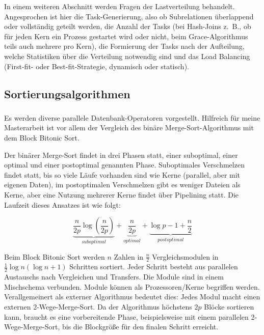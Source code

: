 \documentclass[a4paper,12pt,twoside]{article}
\begin{document}
In einem weiteren Abschnitt werden Fragen der Lastverteilung behandelt. Angesprochen ist hier die Task-Generierung, also ob Subrelationen überlappend oder vollständig geteilt werden, die Anzahl der Tasks (bei Hash-Joins z.~B., ob für jeden Kern ein Prozess gestartet wird oder nicht, beim Grace-Algorithmus teils auch mehrere pro Kern), die Formierung der Tasks nach der Aufteilung, welche Statistiken über die Verteilung notwendig sind und das Load Balancing (First-fit- oder Best-fit-Strategie, dynamisch oder statisch). 

\subsection{Sortierungsalgorithmen}

\subsubsection*{}

Es werden diverse parallele Datenbank-Operatoren vorgestellt. Hilfreich für meine Masterarbeit ist vor allem der Vergleich des binäre Merge-Sort-Algorithmus mit dem Block Bitonic Sort.

Der binärer Merge-Sort findet in drei Phasen statt, einer suboptimal, einer optimal und einer postoptimal genannten Phase. Suboptimales Verschmelzen findet statt, bis so viele Läufe vorhanden sind wie Kerne (parallel, aber mit eigenen Daten), im postoptimalen Verschmelzen gibt es weniger Dateien als Kerne, aber eine Nutzung mehrerer Kerne findet über Pipelining statt. Die Laufzeit dieses Ansatzes ist wie folgt:

\[ \underbrace{\frac{n}{2p} \log \left( \frac{n}{2p} \right)}_{suboptimal} + \underbrace{\frac{n}{2p}}_{optimal} + \underbrace{\log p - 1 + \frac{n}{2}}_{postoptimal} \]

Beim Block Bitonic Sort werden $n$ Zahlen in $\frac{n}{2}$ Vergleichsmodulen in $\frac{1}{2} \log n (\log n +1)$ Schritten sortiert. Jeder Schritt besteht aus parallelen Austauschs nach Vergleichen und Transfers. Die  Module sind in einem Mischschema verbunden. Module können als Prozessoren/Kerne begriffen werden. Verallgemeinert als externer Algorithmus bedeutet dies: Jedes Modul macht einen externen 2-Wege-Merge-Sort. Da der Algorithmus höchstens $2p$ Blöcke sortieren kann, braucht es eine vorbereitende Phase, beispielsweise mit einem parallelen 2-Wege-Merge-Sort, bis die Blockgröße für den finalen Schritt erreicht.
\end{document}
